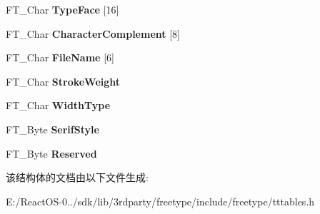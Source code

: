 \begin{DoxyCompactItemize}
F\+T\+\_\+\+Char {\bfseries Type\+Face} \mbox{[}16\mbox{]}
\item 
\mbox{\label{struct_t_t___p_c_l_t___a2641686beb550bcf8d9e598336f0acd9}} 
F\+T\+\_\+\+Char {\bfseries Character\+Complement} \mbox{[}8\mbox{]}
\item 
\mbox{\label{struct_t_t___p_c_l_t___a87691bde7cb06e3043f5320c8223e768}} 
F\+T\+\_\+\+Char {\bfseries File\+Name} \mbox{[}6\mbox{]}
\item 
\mbox{\label{struct_t_t___p_c_l_t___aaf28b05ac07bcdc1ae6f4ec9064434fc}} 
F\+T\+\_\+\+Char {\bfseries Stroke\+Weight}
\item 
\mbox{\label{struct_t_t___p_c_l_t___ad6613ad7556599343f999a7d27a0f1d0}} 
F\+T\+\_\+\+Char {\bfseries Width\+Type}
\item 
\mbox{\label{struct_t_t___p_c_l_t___aa8e3d35937660a1e4959ee10a4800e6a}} 
F\+T\+\_\+\+Byte {\bfseries Serif\+Style}
\item 
\mbox{\label{struct_t_t___p_c_l_t___a2e46e3f5eaa51e02d831d3f6143f8846}} 
F\+T\+\_\+\+Byte {\bfseries Reserved}
\end{DoxyCompactItemize}


该结构体的文档由以下文件生成\+:\begin{DoxyCompactItemize}
\item 
E\+:/\+React\+O\+S-\/0../sdk/lib/3rdparty/freetype/include/freetype/tttables.\+h\end{DoxyCompactItemize}
